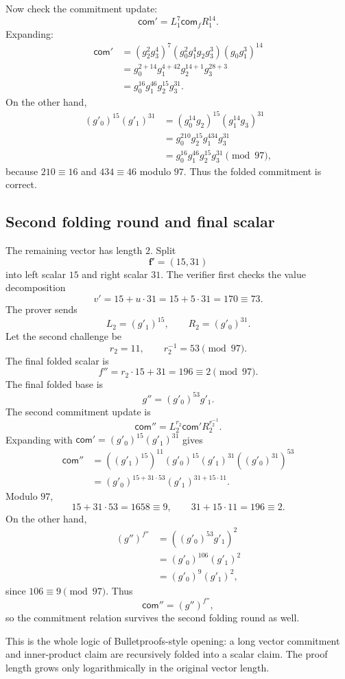 Now check the commitment update:
\[
    \mathsf{com}'=L_1^{7}\mathsf{com}_fR_1^{14}.
\]
Expanding:
\[
\begin{aligned}
\mathsf{com}'
&=(g_2^2g_3^4)^7(g_0^2g_1^4g_2g_3^3)(g_0g_1^3)^{14}\\
&=g_0^{2+14}g_1^{4+42}g_2^{14+1}g_3^{28+3}\\
&=g_0^{16}g_1^{46}g_2^{15}g_3^{31}.
\end{aligned}
\]
On the other hand,
\[
\begin{aligned}
(g'_0)^{15}(g'_1)^{31}
&=(g_0^{14}g_2)^{15}(g_1^{14}g_3)^{31}\\
&=g_0^{210}g_2^{15}g_1^{434}g_3^{31}\\
&=g_0^{16}g_1^{46}g_2^{15}g_3^{31}\pmod{97},
\end{aligned}
\]
because $210\equiv16$ and $434\equiv46$ modulo $97$. Thus the folded commitment is correct.

\subsection{Second folding round and final scalar}

The remaining vector has length $2$. Split
\[
    \mathbf f'=(15,31)
\]
into left scalar $15$ and right scalar $31$. The verifier first checks the value decomposition
\[
    v'=15+u\cdot31=15+5\cdot31=170\equiv73.
\]
The prover sends
\[
    L_2=(g'_1)^{15},
    \qquad
    R_2=(g'_0)^{31}.
\]
Let the second challenge be
\[
    r_2=11,
    \qquad
    r_2^{-1}=53\pmod{97}.
\]
The final folded scalar is
\[
    f''=r_2\cdot15+31=196\equiv2\pmod{97}.
\]
The final folded base is
\[
    g''=(g'_0)^{53}g'_1.
\]
The second commitment update is
\[
    \mathsf{com}''=L_2^{r_2}\mathsf{com}'R_2^{r_2^{-1}}.
\]
Expanding with $\mathsf{com}'=(g'_0)^{15}(g'_1)^{31}$ gives
\[
\begin{aligned}
\mathsf{com}''
&=((g'_1)^{15})^{11}(g'_0)^{15}(g'_1)^{31}((g'_0)^{31})^{53}\\
&=(g'_0)^{15+31\cdot 53}(g'_1)^{31+15\cdot 11}.
\end{aligned}
\]
Modulo $97$,
\[
    15+31\cdot53=1658\equiv 9,
    \qquad
    31+15\cdot11=196\equiv2.
\]
On the other hand,
\[
\begin{aligned}
(g'')^{f''}
&=((g'_0)^{53}g'_1)^2\\
&=(g'_0)^{106}(g'_1)^2\\
&=(g'_0)^9(g'_1)^2,
\end{aligned}
\]
since $106\equiv9\pmod{97}$. Thus
\[
    \mathsf{com}''=(g'')^{f''},
\]
so the commitment relation survives the second folding round as well.

This is the whole logic of Bulletproofs-style opening: a long vector commitment and inner-product claim are recursively folded into a scalar claim. The proof length grows only logarithmically in the original vector length.

